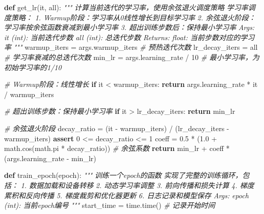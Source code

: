 \documentclass[
]{article}
\newenvironment{Shaded}{}{}
\newcommand{\BuiltInTok}[1]{\textcolor[rgb]{0.00,0.50,0.00}{#1}}
\newcommand{\CommentTok}[1]{\textcolor[rgb]{0.38,0.63,0.69}{\textit{#1}}}
\newcommand{\ControlFlowTok}[1]{\textcolor[rgb]{0.00,0.44,0.13}{\textbf{#1}}}
\newcommand{\DecValTok}[1]{\textcolor[rgb]{0.25,0.63,0.44}{#1}}
\newcommand{\FloatTok}[1]{\textcolor[rgb]{0.25,0.63,0.44}{#1}}
\newcommand{\KeywordTok}[1]{\textcolor[rgb]{0.00,0.44,0.13}{\textbf{#1}}}
\newcommand{\NormalTok}[1]{#1}
\newcommand{\OperatorTok}[1]{\textcolor[rgb]{0.40,0.40,0.40}{#1}}
\begin{document}
\begin{Shaded}
\begin{Highlighting}[]
\KeywordTok{def}\NormalTok{ get\_lr(it, }\BuiltInTok{all}\NormalTok{):}
    \CommentTok{"""}
\CommentTok{    计算当前迭代的学习率，使用余弦退火调度策略}
\CommentTok{    }
\CommentTok{    学习率调度策略：}
\CommentTok{    1. Warmup阶段：学习率从0线性增长到目标学习率}
\CommentTok{    2. 余弦退火阶段：学习率按余弦函数衰减到最小学习率}
\CommentTok{    3. 超出训练步数后：保持最小学习率}
\CommentTok{    }
\CommentTok{    Args:}
\CommentTok{        it (int): 当前迭代步数}
\CommentTok{        all (int): 总迭代步数}
\CommentTok{        }
\CommentTok{    Returns:}
\CommentTok{        float: 当前步数对应的学习率}
\CommentTok{    """}
\NormalTok{    warmup\_iters }\OperatorTok{=}\NormalTok{ args.warmup\_iters  }\CommentTok{\# 预热迭代次数}
\NormalTok{    lr\_decay\_iters }\OperatorTok{=} \BuiltInTok{all}  \CommentTok{\# 学习率衰减的总迭代次数}
\NormalTok{    min\_lr }\OperatorTok{=}\NormalTok{ args.learning\_rate }\OperatorTok{/} \DecValTok{10}  \CommentTok{\# 最小学习率，为初始学习率的1/10}

    \CommentTok{\# Warmup阶段：线性增长}
    \ControlFlowTok{if}\NormalTok{ it }\OperatorTok{\textless{}}\NormalTok{ warmup\_iters:}
        \ControlFlowTok{return}\NormalTok{ args.learning\_rate }\OperatorTok{*}\NormalTok{ it }\OperatorTok{/}\NormalTok{ warmup\_iters}
    
    \CommentTok{\# 超出训练步数：保持最小学习率}
    \ControlFlowTok{if}\NormalTok{ it }\OperatorTok{\textgreater{}}\NormalTok{ lr\_decay\_iters:}
        \ControlFlowTok{return}\NormalTok{ min\_lr}
    
    \CommentTok{\# 余弦退火阶段}
\NormalTok{    decay\_ratio }\OperatorTok{=}\NormalTok{ (it }\OperatorTok{{-}}\NormalTok{ warmup\_iters) }\OperatorTok{/}\NormalTok{ (lr\_decay\_iters }\OperatorTok{{-}}\NormalTok{ warmup\_iters)}
    \ControlFlowTok{assert} \DecValTok{0} \OperatorTok{\textless{}=}\NormalTok{ decay\_ratio }\OperatorTok{\textless{}=} \DecValTok{1}
\NormalTok{    coeff }\OperatorTok{=} \FloatTok{0.5} \OperatorTok{*}\NormalTok{ (}\FloatTok{1.0} \OperatorTok{+}\NormalTok{ math.cos(math.pi }\OperatorTok{*}\NormalTok{ decay\_ratio))  }\CommentTok{\# 余弦系数}
    \ControlFlowTok{return}\NormalTok{ min\_lr }\OperatorTok{+}\NormalTok{ coeff }\OperatorTok{*}\NormalTok{ (args.learning\_rate }\OperatorTok{{-}}\NormalTok{ min\_lr)}

\KeywordTok{def}\NormalTok{ train\_epoch(epoch):}
    \CommentTok{"""}
\CommentTok{    训练一个epoch的函数}
\CommentTok{    }
\CommentTok{    实现了完整的训练循环，包括：}
\CommentTok{    1. 数据加载和设备转移}
\CommentTok{    2. 动态学习率调整}
\CommentTok{    3. 前向传播和损失计算}
\CommentTok{    4. 梯度累积和反向传播}
\CommentTok{    5. 梯度裁剪和优化器更新}
\CommentTok{    6. 日志记录和模型保存}
\CommentTok{    }
\CommentTok{    Args:}
\CommentTok{        epoch (int): 当前epoch编号}
\CommentTok{    """}
\NormalTok{    start\_time }\OperatorTok{=}\NormalTok{ time.time()  }\CommentTok{\# 记录开始时间}
    

\end{Highlighting}
\end{Shaded}
\end{document}
